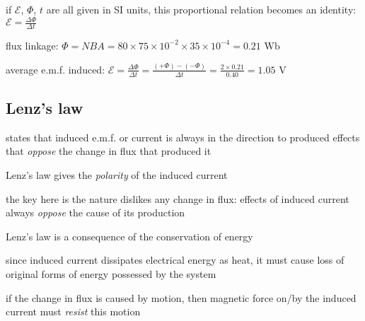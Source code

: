 \cmt if $\mathcal{E}$, $\Phi$, $t$ are all given in SI units, this proportional relation becomes an identity: $\boxed{\mathcal{E} = \frac{\Delta \Phi}{\Delta t}}$


\sol flux linkage: $\Phi = NBA = 80 \times 75\times10^{-2} \times 35 \times 10^{-4} = 0.21 \text{ Wb}$

average e.m.f. induced: $\mathcal{E} = \frac{\Delta \Phi}{\Delta t} = \frac{(+\Phi)-(-\Phi)}{\Delta t} = \frac{2\times 0.21}{0.40} = 1.05 \text{ V}$ \eoe

\subsection{Lenz's law}

\rcyskip

\begin{ilight}
	 states that induced e.m.f. or current is always in the direction to produced effects that \emph{oppose} the change in flux that produced it 
\end{ilight}

\cmt Lenz's law gives the \emph{polarity} of the induced current

the key here is the nature dislikes any change in flux: effects of induced current always \emph{oppose} the cause of its production

\cmt Lenz's law is a consequence of the conservation of energy

since induced current dissipates electrical energy as heat, it must cause loss of original forms of energy possessed by the system

if the change in flux is caused by motion, then magnetic force on/by the induced current must \emph{resist} this motion



